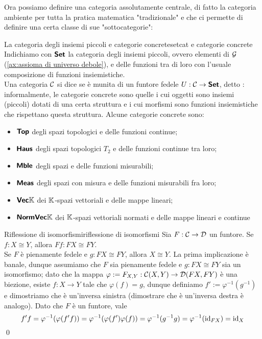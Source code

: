 \documentclass{article}
\renewcommand\C{\mc{C}}
\newcommand\D{\mc{D}}
\begin{document}
Ora possiamo definire una categoria assolutamente centrale, di fatto la categoria ambiente per tutta la pratica matematica "tradizionale" e che ci permette di definire una certa classe di sue "sottocategorie":

\begin{example}{La categoria degli insiemi piccoli e categorie concrete}{setcat e categorie concrete}
    Indichiamo con $\text{\sffamily\textbf{Set}}$ la categoria degli insiemi piccoli, ovvero elementi di $\mathcal{G}$ (\ref{ax:assioma di universo debole}), e delle funzioni tra di loro con l'usuale composizione di funzioni insiemistiche.\\
    Una categoria $\C$ si dice  se è munita di un funtore fedele $U:\C\to\setcat$, detto : informalmente, le categorie concrete sono quelle i cui oggetti sono insiemi (piccoli) dotati di una certa struttura e i cui morfismi sono funzioni insiemistiche che rispettano questa struttura. Alcune categorie concrete sono:\begin{itemize}
        \item $\text{\sffamily\textbf{Top}}$ degli spazi topologici e delle funzioni continue;
        \item $\text{\sffamily\textbf{Haus}}$ degli spazi topologici $T_2$ e delle funzioni continue tra loro;
        \item $\text{\sffamily\textbf{Mble}}$ degli spazi e delle funzioni misurabili;
        \item $\text{\sffamily\textbf{Meas}}$ degli spazi con misura e delle funzioni misurabili fra loro;
        \item $\text{\sffamily\textbf{Vec}}\mathbb{K}$ dei $\mathbb{K}$-spazi vettoriali e delle mappe lineari;
        \item $\text{\sffamily\textbf{NormVec}}\mathbb{K}$ dei $\mathbb{K}$-spazi vettoriali normati e delle mappe lineari e continue
    \end{itemize}
\end{example}

\begin{lemma}{Riflessione di isomorfismi}{riflessione di isomorfismi}
    Sia $F:\C\to\D$ un funtore. Se $f:X\cong Y$, allora $Ff:FX\cong FY$.\\
    Se $F$ è pienamente fedele e $g:FX\cong FY$, allora $X\cong Y$.
    \proof 
    La prima implicazione è banale, dunque assumiamo che $F$ sia pienamente fedele e $g:FX\cong FY$ sia un isomorfismo; dato che la mappa $\varphi := F_{X,Y} : \C(X,Y) \to \D(FX,FY)$ è una biezione, esiste $f: X\to Y$ tale che $\varphi(f) = g$, dunque definiamo $f' := \varphi^{-1}(g^{-1})$ e dimostriamo che è un'inversa sinistra (dimostrare che è un'inversa destra è analogo). Dato che $F$ è un funtore, vale
    \[f'f = \varphi^{-1}(\varphi(f'f) )=\varphi^{-1}(\varphi(f')\varphi(f)) = \varphi^{-1}(g^{-1}g) = \varphi^{-1}(\operatorname{id}_{FX}) = \operatorname{id}_X\]
    \qed
\end{lemma}
\end{document}

